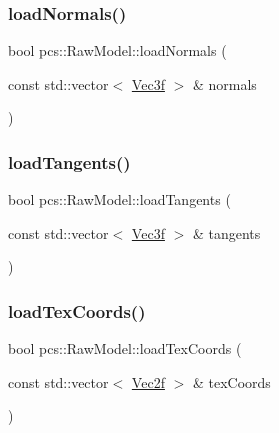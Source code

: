 \mbox{\label{classpcs_1_1RawModel_a5271416a4170cf08bd5350749d685b7c}} 
\subsubsection{\texorpdfstring{load\+Normals()}{loadNormals()}}
{\footnotesize\ttfamily bool pcs\+::\+Raw\+Model\+::load\+Normals (\begin{DoxyParamCaption}\item[{const std\+::vector$<$ \hyperlink{namespacepcs_a68e0f517680976c17c810ffe6952cbab}{Vec3f} $>$ \&}]{normals }\end{DoxyParamCaption})}

\mbox{\label{classpcs_1_1RawModel_a85196296fb104770053b215548c6341e}} 
\subsubsection{\texorpdfstring{load\+Tangents()}{loadTangents()}}
{\footnotesize\ttfamily bool pcs\+::\+Raw\+Model\+::load\+Tangents (\begin{DoxyParamCaption}\item[{const std\+::vector$<$ \hyperlink{namespacepcs_a68e0f517680976c17c810ffe6952cbab}{Vec3f} $>$ \&}]{tangents }\end{DoxyParamCaption})}

\mbox{\label{classpcs_1_1RawModel_acac5d3775fec41de4df5ba961b32d18c}} 
\subsubsection{\texorpdfstring{load\+Tex\+Coords()}{loadTexCoords()}}
{\footnotesize\ttfamily bool pcs\+::\+Raw\+Model\+::load\+Tex\+Coords (\begin{DoxyParamCaption}\item[{const std\+::vector$<$ \hyperlink{namespacepcs_a4b2fd718bd0800b6aa492b1c60f19edc}{Vec2f} $>$ \&}]{tex\+Coords }\end{DoxyParamCaption})}

